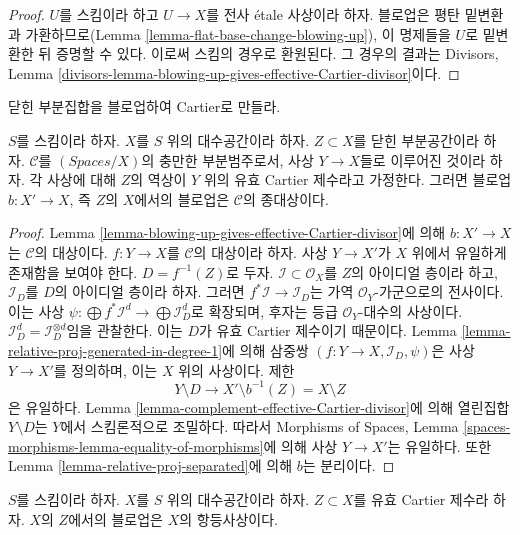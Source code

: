 \begin{proof}
$U$를 스킴이라 하고 $U \to X$를 전사 \'etale 사상이라 하자.
블로업은 평탄 밑변환과 가환하므로(Lemma
\ref{lemma-flat-base-change-blowing-up}), 이 명제들을 $U$로
밑변환한 뒤 증명할 수 있다. 이로써 스킴의 경우로 환원된다. 그 경우의
결과는 Divisors, Lemma
\ref{divisors-lemma-blowing-up-gives-effective-Cartier-divisor}이다.
\end{proof}

\begin{lemma}[블로업의 보편 성질]
\label{lemma-universal-property-blowing-up}
\begin{slogan}
닫힌 부분집합을 블로업하여 Cartier로 만들라.
\end{slogan}
$S$를 스킴이라 하자. $X$를 $S$ 위의 대수공간이라 하자.
$Z \subset X$를 닫힌 부분공간이라 하자.
$\mathcal{C}$를 $(\textit{Spaces}/X)$의 충만한 부분범주로서, 사상
$Y \to X$들로 이루어진 것이라 하자. 각 사상에 대해 $Z$의 역상이
$Y$ 위의 유효 Cartier 제수라고 가정한다. 그러면 블로업
$b : X' \to X$, 즉 $Z$의 $X$에서의 블로업은
$\mathcal{C}$의 종대상이다.
\end{lemma}

\begin{proof}
Lemma \ref{lemma-blowing-up-gives-effective-Cartier-divisor}에 의해
$b : X' \to X$는 $\mathcal{C}$의 대상이다.
$f : Y \to X$를 $\mathcal{C}$의 대상이라 하자. 사상 $Y \to X'$가
$X$ 위에서 유일하게 존재함을 보여야 한다. $D = f^{-1}(Z)$로 두자.
$\mathcal{I} \subset \mathcal{O}_X$를 $Z$의 아이디얼 층이라 하고,
$\mathcal{I}_D$를 $D$의 아이디얼 층이라 하자. 그러면
$f^*\mathcal{I} \to \mathcal{I}_D$는 가역 $\mathcal{O}_Y$-가군으로의
전사이다. 이는 사상
$\psi : \bigoplus f^*\mathcal{I}^d \to \bigoplus \mathcal{I}_D^d$로
확장되며, 후자는 등급 $\mathcal{O}_Y$-대수의 사상이다.
$\mathcal{I}_D^d = \mathcal{I}_D^{\otimes d}$임을 관찰한다. 이는
$D$가 유효 Cartier 제수이기 때문이다.
Lemma \ref{lemma-relative-proj-generated-in-degree-1}에 의해 삼중쌍
$(f : Y \to X, \mathcal{I}_D, \psi)$은 사상 $Y \to X'$를 정의하며,
이는 $X$ 위의 사상이다. 제한
$$
Y \setminus D \longrightarrow X' \setminus b^{-1}(Z) = X \setminus Z
$$
은 유일하다. Lemma \ref{lemma-complement-effective-Cartier-divisor}에
의해 열린집합 $Y \setminus D$는 $Y$에서 스킴론적으로 조밀하다.
따라서 Morphisms of Spaces, Lemma
\ref{spaces-morphisms-lemma-equality-of-morphisms}에 의해 사상
$Y \to X'$는 유일하다. 또한 Lemma
\ref{lemma-relative-proj-separated}에 의해 $b$는 분리이다.
\end{proof}

\begin{lemma}
\label{lemma-blow-up-effective-Cartier-divisor}
$S$를 스킴이라 하자. $X$를 $S$ 위의 대수공간이라 하자.
$Z \subset X$를 유효 Cartier 제수라 하자. $X$의 $Z$에서의 블로업은
$X$의 항등사상이다.
\end{lemma}

